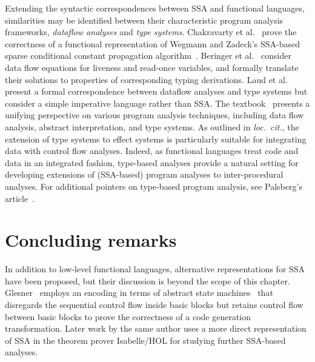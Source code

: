 {%

Extending the syntactic correspondences between SSA and functional
languages, similarities may be identified between their characteristic
program analysis frameworks, \emph{dataflow analyses} and \emph{type
systems}.  Chakravarty et al.~\cite{ChakravartyKZ:COCV03} prove the
correctness of a functional representation of Wegmann and Zadeck's
SSA-based sparse conditional constant propagation
algorithm~\cite{WegmannZ:Toplas1991}.  Beringer et
al.~\cite{DBLP:journals/entcs/BeringerMS03} consider data flow
equations for liveness and read-once variables, and formally translate
their solutions to properties of corresponding typing derivations.
Laud et al.~\cite{DBLP:journals/tcs/LaudUV06} present a formal
correspondence between dataflow analyses and type systems but consider
a simple imperative language rather than SSA. The
textbook~\cite{DBLP:books/daglib/0015430} presents a unifying
perspective on various program analysis techniques, including data
flow analysis, abstract interpretation, and type systems. As outlined
in \emph{loc.~cit.}, the extension of type systems to effect systems
is particularly suitable for integrating data with control flow
analyses. Indeed, as functional languages treat code and data in an
integrated fashion, type-based analyses provide a natural setting for
developing extensions of (SSA-based) program analyses to
inter-procedural analyses. For additional pointers on type-based
program analysis, see Palsberg's article~\cite{Palsberg:2001:TAA:379605.379635}.
%


\section{Concluding remarks}
\label{section:Part1:Semantics:Conclusion}
In addition to low-level functional languages, alternative
representations for SSA have been proposed, but their discussion is
beyond the scope of this chapter.
Glesner~\cite{DBLP:conf/asm/Glesner04} employs an encoding in terms of
abstract state machines~\cite{DBLP:journals/tocl/Gurevich00} that
disregards the sequential control flow inside basic blocks but retains
control flow between basic blocks to prove the correctness of a code
generation transformation. Later work by the same author uses a more
direct representation of SSA in the theorem prover Isabelle/HOL for
studying further SSA-based analyses.

}
